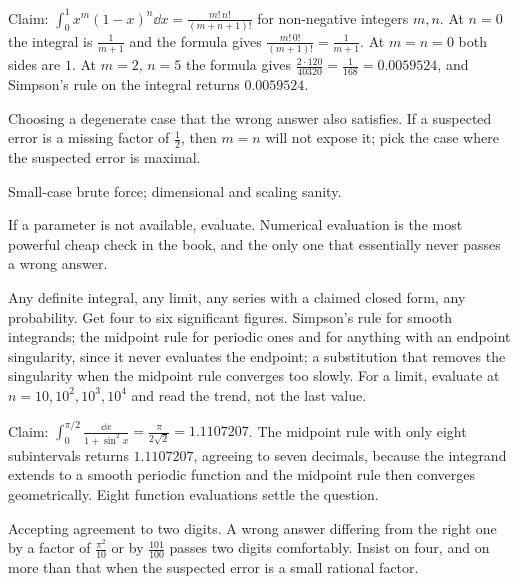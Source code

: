 \begin{worked}
Claim: $\displaystyle\int_{0}^{1}x^{m}(1-x)^{n}\dd x=\frac{m!\,n!}{(m+n+1)!}$ for non-negative integers $m,n$. At $n=0$ the integral is $\frac{1}{m+1}$ and the formula gives $\frac{m!\,0!}{(m+1)!}=\frac{1}{m+1}$. At $m=n=0$ both sides are $1$. At $m=2$, $n=5$ the formula gives $\frac{2\cdot 120}{40320}=\frac{1}{168}=0.0059524$, and Simpson's rule on the integral returns $0.0059524$.
\end{worked}

\begin{trap}
Choosing a degenerate case that the wrong answer also satisfies. If a suspected error is a missing factor of $\frac12$, then $m=n$ will not expose it; pick the case where the suspected error is maximal.
\end{trap}

\begin{seealsob}Small-case brute force; dimensional and scaling sanity.\end{seealsob}

If a parameter is not available, evaluate. Numerical evaluation is the most powerful cheap check in the book, and the only one that essentially never passes a wrong answer.

\cue Any definite integral, any limit, any series with a claimed closed form, any probability.
\method Get four to six significant figures. Simpson's rule for smooth integrands; the midpoint rule for periodic ones and for anything with an endpoint singularity, since it never evaluates the endpoint; a substitution that removes the singularity when the midpoint rule converges too slowly. For a limit, evaluate at $n=10,10^{2},10^{3},10^{4}$ and read the trend, not the last value.

\begin{worked}
Claim: $\displaystyle\int_{0}^{\pi/2}\frac{\dd x}{1+\sin^{2}x}=\frac{\pi}{2\sqrt2}=1.1107207$. The midpoint rule with only eight subintervals returns $1.1107207$, agreeing to seven decimals, because the integrand extends to a smooth periodic function and the midpoint rule then converges geometrically. Eight function evaluations settle the question.
\end{worked}

\begin{trap}
Accepting agreement to two digits. A wrong answer differing from the right one by a factor of $\frac{\pi^{2}}{10}$ or by $\frac{101}{100}$ passes two digits comfortably. Insist on four, and on more than that when the suspected error is a small rational factor.
\end{trap}

